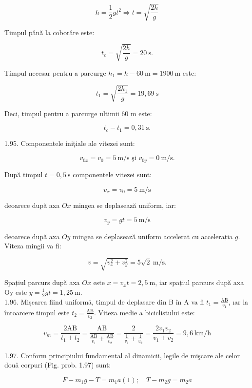 $$
h=\frac{1}{2} g t^{2} \Rightarrow t=\sqrt{\frac{2 h}{g}}
$$

Timpul până la coborâre este:

$$
t_{c}=\sqrt{\frac{2 h}{g}}=20 \mathrm{~s} .
$$

Timpul necesar pentru a parcurge $h_{1}=h-60 \mathrm{~m}=1900 \mathrm{~m}$ este:

$$
t_{1}=\sqrt{\frac{2 h_{1}}{g}}=19,69 \mathrm{~s}
$$

Deci, timpul pentru a parcurge ultimii 60 m este:

$$
t_{c}-t_{1}=0,31 \mathrm{~s} .
$$

1.95. Componentele inițiale ale vitezei sunt:

$$
v_{0 x}=v_{0}=5 \mathrm{~m} / \mathrm{s} \text { şi } v_{0 y}=0 \mathrm{~m} / \mathrm{s} .
$$

După timpul $t=0,5 \mathrm{~s}$ componentele vitezei sunt:

$$
v_{x}=v_{0}=5 \mathrm{~m} / \mathrm{s}
$$

deoarece după axa $O x$ mingea se deplasează uniform, iar:

$$
v_{y}=g t=5 \mathrm{~m} / \mathrm{s}
$$

deoarece după axa $O y$ mingea se deplasează uniform accelerat cu accelerația $g$.\\
Viteza mingii va fi:

$$
v=\sqrt{v_{x}^{2}+v_{y}^{2}}=5 \sqrt{2} \mathrm{~m} / \mathrm{s} .
$$

Spațiul parcurs după axa $O x$ este $x=v_{x} t=2,5 \mathrm{~m}$, iar spațiul parcurs după axa Oy este $y=\frac{1}{2} g t=1,25 \mathrm{~m}$.\\
1.96. Mișcarea fiind uniformă, timpul de deplasare din B în A va fi $t_{1}=\frac{\mathrm{AB}}{v_{1}}$, ıar la întoarcere timpul este $t_{2}=\frac{\mathrm{AB}}{v_{2}}$. Viteza medie a biciclistului este:

$$
v_{m}=\frac{2 \mathrm{AB}}{t_{1}+t_{2}}=\frac{\mathrm{AB}}{\frac{\mathrm{AB}}{v_{1}}+\frac{\mathrm{AB}}{v_{2}}}=\frac{2}{\frac{1}{v_{1}}+\frac{1}{v_{2}}}=\frac{2 v_{1} v_{2}}{v_{1}+v_{2}}=9,6 \mathrm{~km} / \mathrm{h}
$$

1.97. Conform principiului fundamental al dinamicii, legile de mişcare ale celor două corpuri (Fig. prob. 1.97) sunt:


\begin{equation*}
F-m_{1} g-T=m_{1} a(1) ; \quad T-m_{2} g=m_{2} a \tag{2}
\end{equation*}



